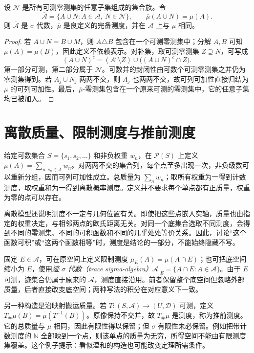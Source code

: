 \begin{proposition}[完备化]
设 $\mathcal N$ 是所有可测零测集的任意子集组成的集合族。令
\[
 \overline{\mathcal A}=\{A\cup N:A\in\mathcal A,\ N\in\mathcal N\},\qquad
 \overline\mu(A\cup N)=\mu(A).
\]
则 $\overline{\mathcal A}$ 是 $\sigma$ 代数，$\overline\mu$ 是良定义的完备测度，并在 $\mathcal A$ 上与 $\mu$ 相同。
\label{prop:mt-completion}
\end{proposition}
\begin{proof}
若 $A\cup N=B\cup M$，则 $A\triangle B$ 包含在一个可测零测集中；分解 $A,B$ 可知 $\mu(A)=\mu(B)$，因此定义不依赖表示。对补集，取可测零测集 $Z\supseteq N$，可写成
\[
 (A\cup N)^c=(A^c\setminus Z)\cup\bigl((A\cup N)^c\cap Z\bigr).
\]
第一部分可测，第二部分属于 $\mathcal N$。可数并的封闭性由可数个可测零测集之并仍为零测集得到。若 $A_j\cup N_j$ 两两不交，则 $A_j$ 也两两不交，故可列可加性直接归结为 $\mu$ 的可列可加性。最后，$\overline\mu$-零测集包含在一个原来可测的零测集中，它的任意子集均已被加入。
\end{proof}

\section{离散质量、限制测度与推前测度}
给定可数集合 $S=\{s_1,s_2,\ldots\}$ 和非负权重 $w_n$，在 $\mathcal P(S)$ 上定义
$\mu(A)=\sum_{n:s_n\in A}w_n$。对两两不交的集合列，每个点至多出现一次，非负级数可以重新分组，因而可列可加性成立。总质量为 $\sum_nw_n$；取所有权重为一得到计数测度，取权重和为一得到离散概率测度。定义并不要求每个单点都有正质量，权重为零的点可以存在。

离散模型还说明测度不一定与几何位置有关。即使把这些点嵌入实轴，质量也由指定的权重决定，与相邻两点的欧氏距离无关。对同一个底集合选取不同测度，会得到不同的零测集、不同的可积函数和不同的几乎处处等价关系。因此，讨论“这个函数可积”或“这两个函数相等”时，测度是结论的一部分，不能始终隐藏不写。

固定 $E\in\mathcal A$，可在原空间上定义限制测度 $\mu_E(A)=\mu(A\cap E)$；也可把底空间缩小为 $E$，使用\emph{迹 $\sigma$ 代数（trace sigma-algebra）}$\mathcal A|_E=\{A\cap E:A\in\mathcal A\}$。由于 $E$ 可测，迹集合仍属于原来的 $\mathcal A$，测度直接沿用。前者保留整个底空间但忽略外部质量，后者直接改变底空间；两种写法的积分在对应意义下一致。

另一种构造是沿映射搬运质量。若 $T:(S,\mathcal A)\to(U,\mathcal D)$ 可测，定义
$T_\#\mu(B)=\mu(T^{-1}(B))$。原像保持不交并，故 $T_\#\mu$ 是测度，称为推前测度。它的总质量与 $\mu$ 相同，因此有限性得以保留；但 $\sigma$ 有限性未必保留。例如把带计数测度的 $\mathbb N$ 全部映到一个点，则该单点的质量为无穷，所得空间不能由有限测度集覆盖。这个例子提示：看似温和的构造也可能改变定理所需条件。

